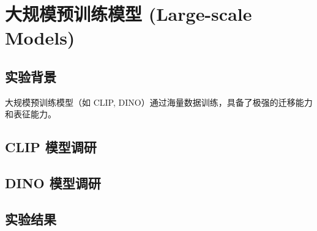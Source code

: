 \chapter{大规模预训练模型 (Large-scale Models)}
\label{chap:large_scale_models}

\section{实验背景}
大规模预训练模型（如 CLIP, DINO）通过海量数据训练，具备了极强的迁移能力和表征能力。

\section{CLIP 模型调研}

\section{DINO 模型调研}

\section{实验结果}
